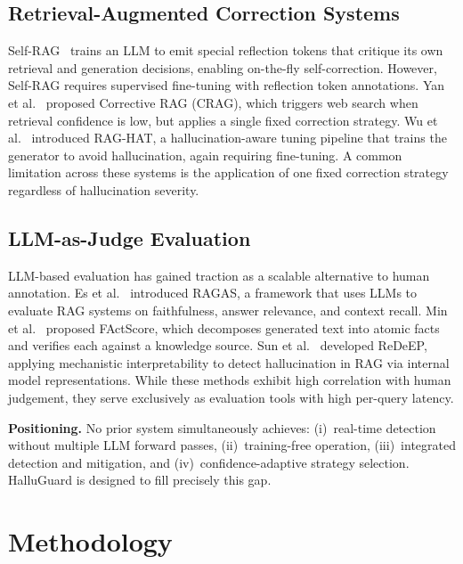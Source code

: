 \documentclass[conference]{IEEEtran}
\begin{document}
\subsection{Retrieval-Augmented Correction Systems}

Self-RAG~\cite{asai2024selfrag} trains an LLM to emit special reflection tokens that critique its own retrieval and generation decisions, enabling on-the-fly self-correction. However, Self-RAG requires supervised fine-tuning with reflection token annotations. Yan et al.~\cite{yan2024crag} proposed Corrective RAG (CRAG), which triggers web search when retrieval confidence is low, but applies a single fixed correction strategy. Wu et al.~\cite{wu2024raghat} introduced RAG-HAT, a hallucination-aware tuning pipeline that trains the generator to avoid hallucination, again requiring fine-tuning. A common limitation across these systems is the application of one fixed correction strategy regardless of hallucination severity.

\subsection{LLM-as-Judge Evaluation}

LLM-based evaluation has gained traction as a scalable alternative to human annotation. Es et al.~\cite{es2024ragas} introduced RAGAS, a framework that uses LLMs to evaluate RAG systems on faithfulness, answer relevance, and context recall. Min et al.~\cite{min2023factscore} proposed FActScore, which decomposes generated text into atomic facts and verifies each against a knowledge source. Sun et al.~\cite{sun2025redeep} developed ReDeEP, applying mechanistic interpretability to detect hallucination in RAG via internal model representations. While these methods exhibit high correlation with human judgement, they serve exclusively as evaluation tools with high per-query latency.

\medskip
\noindent\textbf{Positioning.} No prior system simultaneously achieves: (i)~real-time detection without multiple LLM forward passes, (ii)~training-free operation, (iii)~integrated detection and mitigation, and (iv)~confidence-adaptive strategy selection. HalluGuard is designed to fill precisely this gap.

\section{Methodology}
\end{document}
